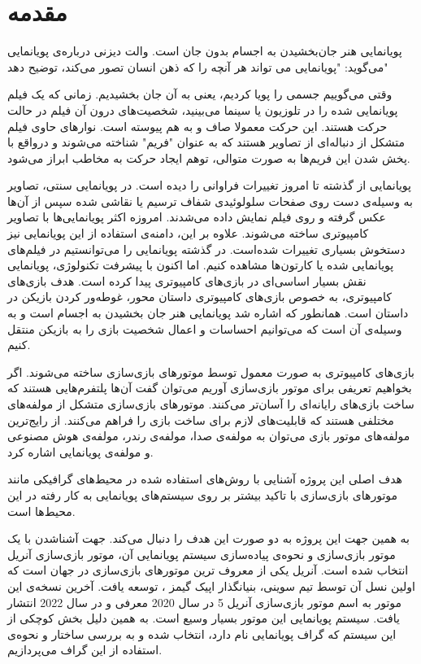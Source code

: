 \chapter{مقدمه}






پویانمایی هنر جان‌بخشیدن به اجسام بدون جان است.
والت دیزنی درباره‌‌ی پویانمایی می‌گوید: "پویانمایی می تواند هر آنچه را که ذهن انسان تصور می‌کند، توضیح دهد"

وقتی می‌گوییم جسمی را پویا کردیم، یعنی به آن جان بخشیدیم.
زمانی که یک فیلم پویانمایی شده را در تلوزیون یا سینما می‌بینید، شخصیت‌های درون آن فیلم در حالت حرکت هستند.
این حرکت معمولا صاف و به هم پیوسته است. نوارهای حاوی فیلم متشکل از دنباله‌ای از تصاویر هستند که به عنوان "فریم" شناخته می‌شوند و درواقع با پخش شدن این فریم‌ها
به صورت متوالی، توهم ایجاد حرکت به مخاطب ابراز می‌شود.

پویانمایی از گذشته تا امروز تغییرات فراوانی را دیده است.
در پویانمایی سنتی، تصاویر به وسیله‌‌ی دست روی صفحات سلولوئیدی شفاف ترسیم یا نقاشی شده 
سپس از آن‌ها عکس گرفته و روی فیلم نمایش داده می‌شدند.
امروزه اکثر پویانمایی‌ها با تصاویر کامپیوتری
ساخته می‌شوند.
\cite{AnimationWikipedia}
علاوه بر این، دامنه‌ی استفاده از این پویانمایی نیز دستخوش بسیاری تغییرات شده‌است.
در گذشته پویانمایی را می‌توانستیم در فیلم‌های پویانمایی شده یا کارتون‌ها مشاهده کنیم.
اما اکنون با پیشرفت تکنولوژی، پویانمایی نقش بسیار اساسی‌ای در بازی‌های کامپیوتری پیدا کرده است.
هدف بازی‌‌های کامپیوتری، به خصوص بازی‌های کامپیوتری داستان محور، غوطه‌ور کردن بازیکن 
در داستان است.
همانطور که اشاره شد پویانمایی هنر جان بخشیدن به اجسام است و به وسیله‌ی 
آن است که می‌توانیم احساسات و اعمال شخصیت بازی را به بازیکن منتقل کنیم.

بازی‌های کامپیوتری به صورت معمول توسط موتور‌های بازی‌سازی ساخته می‌شوند.
اگر بخواهیم تعریفی برای موتور بازی‌سازی آوریم می‌توان گفت 
آن‌ها پلتفرم‌هایی هستند که ساخت بازی‌های رایانه‌ای را آسان‌تر می‌کنند.
موتور‌های بازی‌سازی متشکل از مولفه‌های مختلفی هستند که قابلیت‌های لازم برای ساخت بازی را فراهم می‌کنند.
از رایج‌ترین مولفه‌های موتور بازی می‌توان به مولفه‌ی صدا، مولفه‌ی رندر، مولفه‌ی هوش مصنوعی و مولفه‌ی پویانمایی اشاره کرد.
\cite{barczak2019comparative}

هدف اصلی این پروژه آشنایی با روش‌های استفاده شده در محیط‌های گرافیکی مانند موتورهای بازی‌سازی با تاکید بیشتر بر 
روی سیستم‌های پویانمایی به کار رفته در این محیط‌ها است.

به همین جهت این پروژه به دو صورت این هدف را دنبال می‌کند.
جهت آشناشدن با یک موتور بازی‌سازی و نحوه‌ی پیاده‌سازی سیستم پویانمایی آن، موتور 
بازی‌سازی آنریل انتخاب شده است.
آنریل یکی از معروف ترین موتور‌های بازی‌سازی در جهان است که اولین نسل آن
توسط تیم سوینی، بنیانگذار اپیک گیمز 
، توسعه یافت.
آخرین نسخه‌ی این موتور به اسم موتور بازی‌سازی آنریل 5 
در سال 2020 معرفی و در سال 2022 انتشار یافت.
سیستم پویانمایی این موتور بسیار وسیع است. به همین دلیل بخش کوچکی از این سیستم که گراف پویانمایی نام دارد، انتخاب شده و
 به بررسی ساختار و نحوه‌ی استفاده از این گراف می‌پردازیم.

